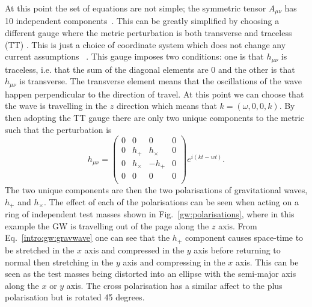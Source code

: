 At this point the set of equations are not simple; the symmetric tensor $A_{\mu \nu}$ has 10 independent
components~. This can be greatly
simplified by choosing a different gauge where the metric perturbation is both
transverse and traceless (TT) \citep{flanagan2005BasicsGravitational}.  This is
just a choice of coordinate system which does not change any current
assumptions ~. This gauge imposes two conditions: one
is that $h_{\mu \nu}$ is traceless, i.e. that the sum of the diagonal elements
are 0 and the other is that $h_{\mu \nu}$ is transverse.  The transverse
element means that the oscillations of the wave happen perpendicular to the
direction of travel.  At this point we can choose that the wave is travelling in
the $z$ direction which means that $k = (\omega,0,0,k)$.  By then adopting the
TT gauge there are only two unique components to the metric such that the
perturbation is
\begin{equation}
\label{intro:gw:gravwave}
h_{\mu \nu} = \left( 
\begin{matrix}
0 & 0 & 0 & 0 \\
0 & h_{+} & h_{\times} & 0 \\
0 & h_{\times} & -h_{+} & 0 \\
0 & 0 & 0 & 0 \\
\end{matrix}
\right) 
e^{i(kt - wt)}.
\end{equation}
The two unique components are then the two polarisations of gravitational
waves, $h_{+}$ and $h_{\times}$. The effect of each of the polarisations can be seen when acting on a ring of independent test masses shown in Fig.~\ref{gw:polarisations}, where in this example the \gls{GW} is travelling out of the page along the $z$ axis.
From Eq.~\ref{intro:gw:gravwave} one can see that the $h_{+}$ component causes space-time to be stretched in the $x$ axis and compressed in the $y$ axis before returning to normal then stretching in the $y$ axis and compressing in the $x$ axis. This can be seen as the test masses being distorted into an ellipse with the semi-major axis along the $x$ or $y$ axis.
The cross polarisation has a similar affect to the plus polarisation but is rotated 45 degrees.
%
